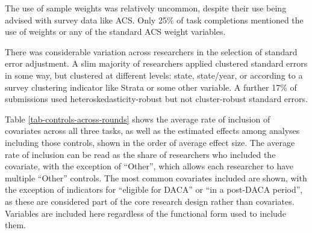 \documentclass[
  letterpaper,
  DIV=11,
  numbers=noendperiod]{scrartcl}
\begin{document}
The use of sample weights was relatively uncommon, despite their use
being advised with survey data like ACS. Only 25\% of task completions
mentioned the use of weights or any of the standard ACS weight
variables.

There was considerable variation across researchers in the selection of
standard error adjustment. A slim majority of researchers applied
clustered standard errors in some way, but clustered at different
levels: state, state/year, or according to a survey clustering indicator
like Strata or some other variable. A further 17\% of submissions used
heteroskedasticity-robust but not cluster-robust standard errors.

\begin{table}[!htbp] \centering \renewcommand*{\arraystretch}{1.1}\caption{Estimation Methods}\label{tab-estimation-methods}
\end{table}

Table \ref{tab-controls-across-rounds} shows the average rate of
inclusion of covariates across all three tasks, as well as the estimated
effects among analyses including those controls, shown in the order of
average effect size. The average rate of inclusion can be read as the
share of researchers who included the covariate, with the exception of
``Other'', which allows each researcher to have multiple ``Other''
controls. The most common covariates included are shown, with the
exception of indicators for ``eligible for DACA'' or ``in a post-DACA
period'', as these are considered part of the core research design
rather than covariates. Variables are included here regardless of the
functional form used to include them.
\end{document}

